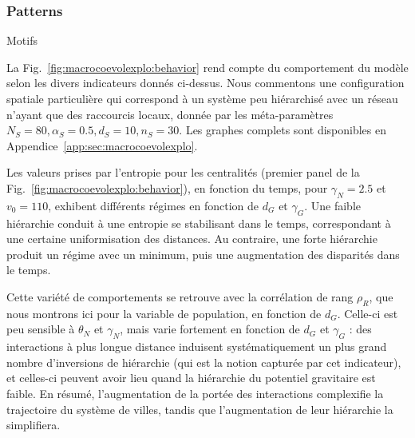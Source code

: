 \subsubsection{Patterns}{Motifs}



La Fig.~\ref{fig:macrocoevolexplo:behavior} rend compte du comportement du modèle selon les divers indicateurs donnés ci-dessus. Nous commentons une configuration spatiale particulière qui correspond à un système peu hiérarchisé avec un réseau n'ayant que des raccourcis locaux, donnée par les méta-paramètres $N_S=80,\alpha_S=0.5,d_S=10,n_S=30$. Les graphes complets sont disponibles en Appendice~\ref{app:sec:macrocoevolexplo}.


Les valeurs prises par l'entropie pour les centralités (premier panel de la Fig.~\ref{fig:macrocoevolexplo:behavior}), en fonction du temps, pour $\gamma_N = 2.5$ et $v_0 = 110$, exhibent différents régimes en fonction de $d_G$ et $\gamma_G$. Une faible hiérarchie conduit à une entropie se stabilisant dans le temps, correspondant à une certaine uniformisation des distances. Au contraire, une forte hiérarchie produit un régime avec un minimum, puis une augmentation des disparités dans le temps.


Cette variété de comportements se retrouve avec la corrélation de rang $\rho_R$, que nous montrons ici pour la variable de population, en fonction de $d_G$. Celle-ci est peu sensible à $\theta_N$ et $\gamma_N$, mais varie fortement en fonction de $d_G$ et $\gamma_G$ : des interactions à plus longue distance induisent systématiquement un plus grand nombre d'inversions de hiérarchie (qui est la notion capturée par cet indicateur), et celles-ci peuvent avoir lieu quand la hiérarchie du potentiel gravitaire est faible. En résumé, l'augmentation de la portée des interactions complexifie la trajectoire du système de villes, tandis que l'augmentation de leur hiérarchie la simplifiera. 


